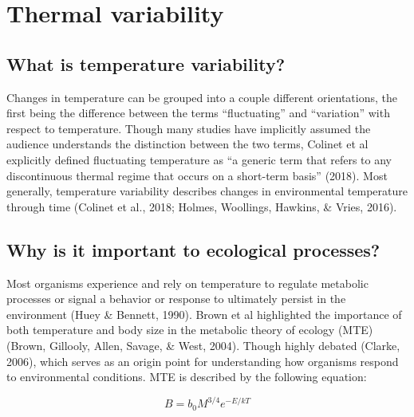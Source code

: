 \documentclass[12pt,twoside]{reedthesis}
\begin{document}
\hypertarget{thermal-variability}{%
\section{Thermal variability}\label{thermal-variability}}

\hypertarget{what-is-temperature-variability}{%
\subsection{What is temperature variability?}\label{what-is-temperature-variability}}

Changes in temperature can be grouped into a couple different orientations, the first being the difference between the terms ``fluctuating'' and ``variation'' with respect to temperature. Though many studies have implicitly assumed the audience understands the distinction between the two terms, Colinet et al explicitly defined fluctuating temperature as ``a generic term that refers to any discontinuous thermal regime that occurs on a short-term basis'' (2018). Most generally, temperature variability describes changes in environmental temperature through time (Colinet et al., 2018; Holmes, Woollings, Hawkins, \& Vries, 2016).

\hypertarget{why-is-it-important-to-ecological-processes}{%
\subsection{Why is it important to ecological processes?}\label{why-is-it-important-to-ecological-processes}}

Most organisms experience and rely on temperature to regulate metabolic processes or signal a behavior or response to ultimately persist in the environment (Huey \& Bennett, 1990). Brown et al highlighted the importance of both temperature and body size in the metabolic theory of ecology (MTE) (Brown, Gillooly, Allen, Savage, \& West, 2004). Though highly debated (Clarke, 2006), which serves as an origin point for understanding how organisms respond to environmental conditions. MTE is described by the following equation:

\[
B = b_0M^{3/4}e^{-E/kT}
\]
\end{document}
